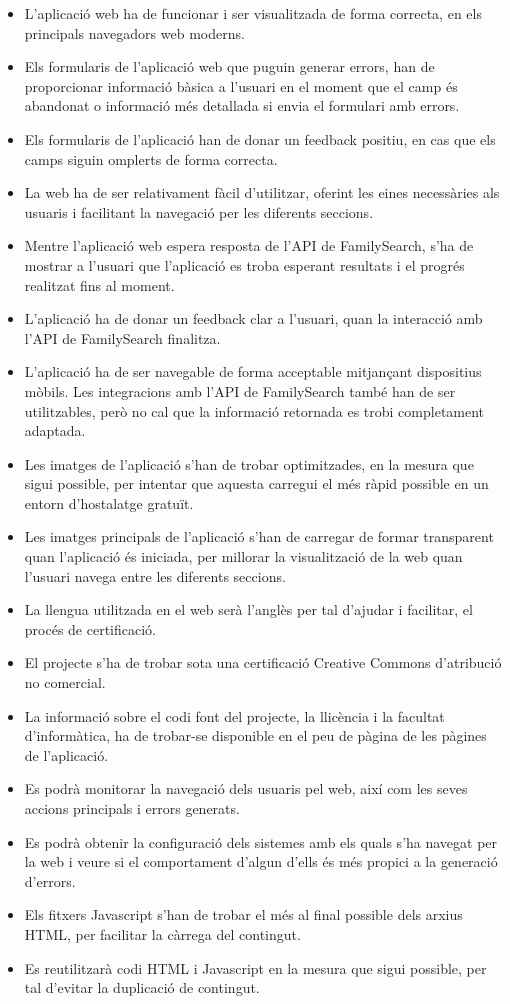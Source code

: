     \begin{itemize}
        \item L'aplicació web ha de funcionar i ser visualitzada de forma correcta, en els principals navegadors web moderns.
        \item Els formularis de l'aplicació web que puguin generar errors, han de proporcionar informació bàsica a l'usuari en el moment que el camp és abandonat o informació més detallada si envia el formulari amb errors.
        \item Els formularis de l’aplicació han de donar un feedback positiu, en cas que els camps siguin omplerts de forma correcta.
        \item La web ha de ser relativament fàcil d'utilitzar, oferint les eines necessàries als usuaris i facilitant la navegació per les diferents seccions.
        \item Mentre l'aplicació web espera resposta de l’API de FamilySearch, s'ha de mostrar a l'usuari que l'aplicació es troba esperant resultats i el progrés rea\-lit\-zat fins al moment.
        \item L'aplicació ha de donar un feedback clar a l'usuari, quan la interacció amb l’API de FamilySearch finalitza.
        \item L'aplicació ha de ser navegable de forma acceptable mitjançant dispositius mò\-bils. Les integracions amb l’API de FamilySearch també han de ser utilitzables, però no cal que la informació retornada es trobi completament adaptada.
        \item Les imatges de l'aplicació s'han de trobar optimitzades, en la mesura que sigui possible, per intentar que aquesta carregui el més ràpid possible en un entorn d'hostalatge gratuït.
        \item Les imatges principals de l'aplicació s'han de carregar de formar transparent quan l'aplicació és iniciada, per millorar la visualització de la web quan l'usuari navega entre les diferents seccions.
        \item La llengua utilitzada en el web serà l'anglès per tal d'ajudar i facilitar, el procés de certificació.
        \item El projecte s'ha de trobar sota una certificació Creative Commons d'atribució no comercial.
        \item La informació sobre el codi font del projecte, la llicència i la facultat d'in\-for\-mà\-ti\-ca, ha de trobar-se disponible en el peu de pàgina de les pàgines de l'aplicació.
        \item Es podrà monitorar la navegació dels usuaris pel web, així com les seves accions principals i errors generats.
        \item Es podrà obtenir la configuració dels sistemes amb els quals s'ha navegat per la web i veure si el comportament d'algun d'ells és més propici a la generació d'errors.
        \item Els fitxers Javascript s'han de trobar el més al final possible dels arxius HTML, per facilitar la càrrega del contingut.
        \item Es reutilitzarà codi HTML i Javascript en la mesura que sigui possible, per tal d'evitar la duplicació de contingut.
    \end{itemize}
